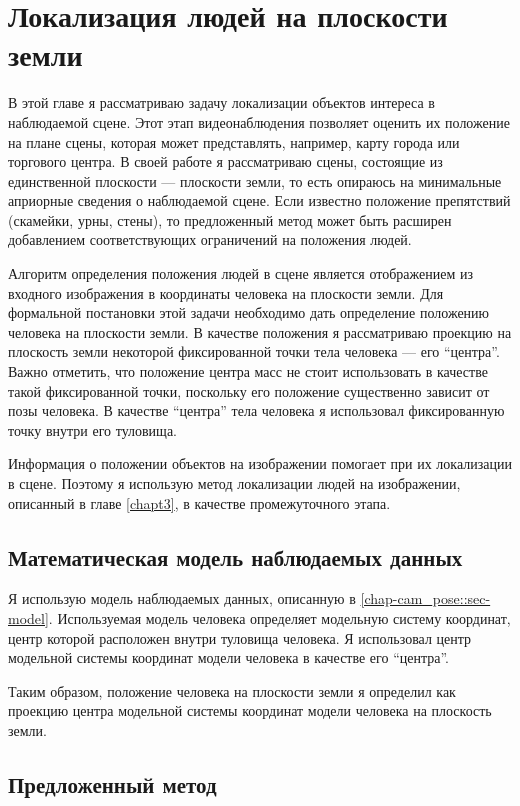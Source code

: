 \chapter{Локализация людей на плоскости земли} \label{chapt4}

В этой главе я рассматриваю задачу локализации объектов интереса в наблюдаемой сцене. Этот этап видеонаблюдения позволяет оценить их положение на плане сцены, которая может представлять, например, карту города или торгового центра. В своей работе я рассматриваю сцены, состоящие из единственной плоскости --- плоскости земли, то есть опираюсь на минимальные априорные сведения о наблюдаемой сцене. Если известно положение препятствий (скамейки, урны, стены), то предложенный метод может быть расширен добавлением соответствующих ограничений на положения людей.

Алгоритм определения положения людей в сцене является отображением из входного изображения в координаты человека на плоскости земли. Для формальной постановки этой задачи необходимо дать определение положению человека на плоскости земли. В качестве положения я рассматриваю проекцию на плоскость земли некоторой фиксированной точки тела человека --- его ``центра''. Важно отметить, что положение центра масс не стоит использовать в качестве такой фиксированной точки, поскольку его положение существенно зависит от позы человека. В качестве ``центра'' тела человека я использовал фиксированную точку внутри его туловища.

Информация о положении объектов на изображении помогает при их локализации в сцене. Поэтому я использую метод локализации людей на изображении, описанный в главе \ref{chapt3}, в качестве промежуточного этапа.

\section{Математическая модель наблюдаемых данных}

Я использую модель наблюдаемых данных, описанную в \ref{chap-cam_pose::sec-model}. Используемая модель человека \cite{pishchulin15arxiv} определяет модельную систему координат, центр которой расположен внутри туловища человека. Я использовал центр модельной системы координат модели человека в качестве его ``центра''.

Таким образом, положение человека на плоскости земли я определил как проекцию центра модельной системы координат модели человека на плоскость земли.

\section{Предложенный метод}

